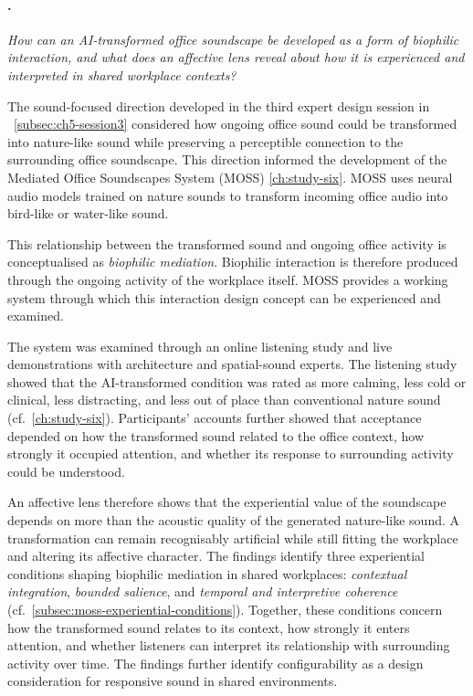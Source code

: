 \paragraph{.}

\emph{How can an AI-transformed office soundscape be developed as a form
of biophilic interaction, and what does an affective lens reveal about
how it is experienced and interpreted in shared workplace contexts?}

The sound-focused direction developed in the third expert design session
in ~\autoref{subsec:ch5-session3} considered how ongoing office sound could be
transformed into nature-like sound while preserving a perceptible
connection to the surrounding office soundscape. This direction informed
the development of the Mediated Office Soundscapes System (MOSS) \autoref{ch:study-six}. MOSS uses neural audio models
trained on nature sounds to transform incoming office audio into bird-like or water-like sound. 

This relationship between the transformed sound and ongoing office activity is conceptualised as \emph{biophilic mediation}. Biophilic interaction is therefore produced through the ongoing activity of the workplace itself. MOSS provides a working system through which this interaction design concept can be experienced and examined.

The system was examined through an online listening study and live
demonstrations with architecture and spatial-sound experts.
The listening study showed that the AI-transformed condition was
rated as more calming, less cold or clinical, less distracting, and
less out of place than conventional nature sound
(cf.~\autoref{ch:study-six}). Participants' accounts further
showed that acceptance depended on how the transformed sound related to
the office context, how strongly it occupied attention, and whether its
response to surrounding activity could be understood.

An affective lens therefore shows that the experiential value of the soundscape depends on more than the acoustic quality of the generated nature-like sound. A transformation can remain recognisably artificial while still fitting the workplace and altering its affective character. The findings identify three experiential conditions shaping biophilic mediation in shared workplaces: \emph{contextual integration}, \emph{bounded salience}, and \emph{temporal and interpretive coherence} (cf.~\autoref{subsec:moss-experiential-conditions}). Together, these conditions concern how the transformed sound relates to its context, how strongly it enters attention, and whether listeners can interpret its relationship with surrounding activity over time. The findings further identify configurability as a design consideration for responsive sound in shared environments.

